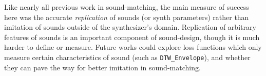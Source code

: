 \documentclass[lettersize,journal]{IEEEtran}
\newcommand{\DTWEnv}{\texttt{DTW\_Envelope}}
\begin{document}
Like nearly all previous work in sound-matching, the main measure of success here was the accurate \textit{replication} of sounds (or synth parameters) rather than imitation of sounds outside of the synthesizer's domain. Replication of arbitrary features of sounds is an important component of sound-design, though it is much harder to define or measure. Future works could explore loss functions which only measure certain characteristics of sound (such as \DTWEnv), and whether they can pave the way for better imitation in sound-matching.



\end{document}
